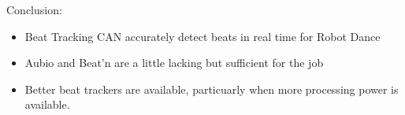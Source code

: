 \documentclass{beamer}
\begin{document}
	\begin{frame}
		Conclusion:
		\begin{itemize}
			\item Beat Tracking CAN accurately detect beats in real time for Robot Dance
			\item Aubio and Beat'n are a little lacking but sufficient for the job
			\item Better beat trackers are available, particuarly when more processing power is available.
		\end{itemize}
	\end{frame}
\end{document}
